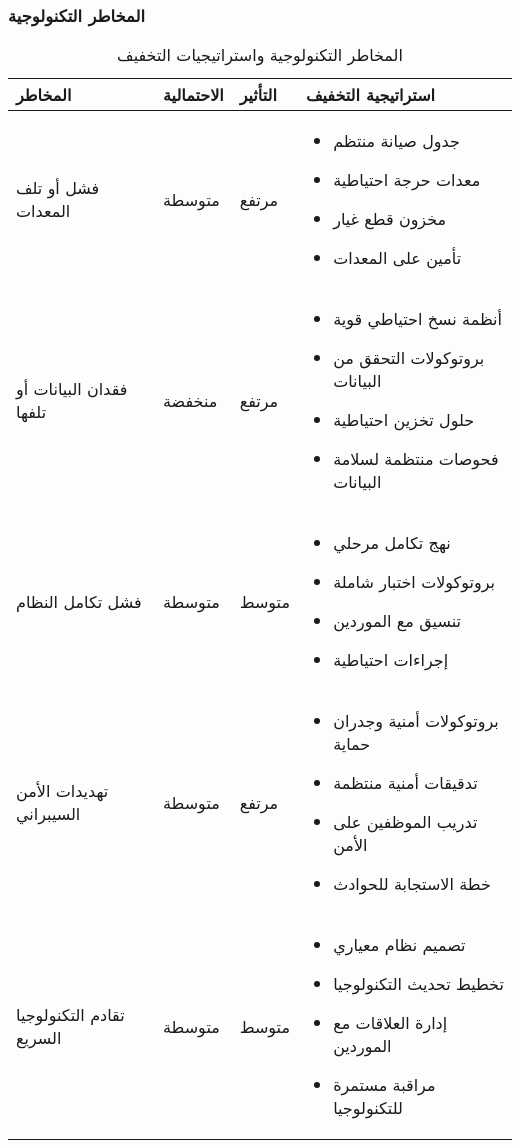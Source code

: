 \subsubsection{المخاطر التكنولوجية}
\begin{table}[H]
\centering
\begin{tabular}{|p{3cm}|p{2cm}|p{2cm}|p{7cm}|}
\hline
\textbf{المخاطر} & \textbf{الاحتمالية} & \textbf{التأثير} & \textbf{استراتيجية التخفيف} \\
\hline
فشل أو تلف المعدات & متوسطة & مرتفع & 
\begin{itemize}
    \item جدول صيانة منتظم
    \item معدات حرجة احتياطية
    \item مخزون قطع غيار
    \item تأمين على المعدات
\end{itemize} \\
\hline
فقدان البيانات أو تلفها & منخفضة & مرتفع & 
\begin{itemize}
    \item أنظمة نسخ احتياطي قوية
    \item بروتوكولات التحقق من البيانات
    \item حلول تخزين احتياطية
    \item فحوصات منتظمة لسلامة البيانات
\end{itemize} \\
\hline
فشل تكامل النظام & متوسطة & متوسط & 
\begin{itemize}
    \item نهج تكامل مرحلي
    \item بروتوكولات اختبار شاملة
    \item تنسيق مع الموردين
    \item إجراءات احتياطية
\end{itemize} \\
\hline
تهديدات الأمن السيبراني & متوسطة & مرتفع & 
\begin{itemize}
    \item بروتوكولات أمنية وجدران حماية
    \item تدقيقات أمنية منتظمة
    \item تدريب الموظفين على الأمن
    \item خطة الاستجابة للحوادث
\end{itemize} \\
\hline
تقادم التكنولوجيا السريع & متوسطة & متوسط & 
\begin{itemize}
    \item تصميم نظام معياري
    \item تخطيط تحديث التكنولوجيا
    \item إدارة العلاقات مع الموردين
    \item مراقبة مستمرة للتكنولوجيا
\end{itemize} \\
\hline
\end{tabular}
\caption{المخاطر التكنولوجية واستراتيجيات التخفيف}
\end{table}

